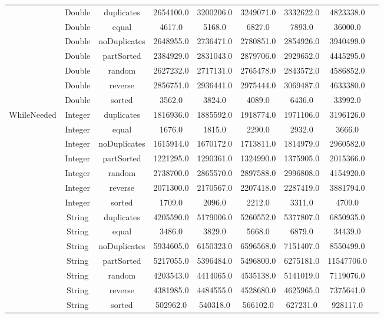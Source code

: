 \documentclass{article}
\begin{document}
\begin{table}[H]
\begin{tabular}{|c|c|c|c|c|c|c|c|c|}
        & Double & duplicates & 2654100.0 & 3200206.0 & 3249071.0 & 3332622.0 & 4823338.0 \\
        & Double & equal & 4617.0 & 5168.0 & 6827.0 & 7893.0 & 36000.0 \\
        & Double & noDuplicates & 2648955.0 & 2736471.0 & 2780851.0 & 2854926.0 & 3940499.0 \\
        & Double & partSorted & 2384929.0 & 2831043.0 & 2879706.0 & 2929652.0 & 4445295.0 \\
        & Double & random & 2627232.0 & 2717131.0 & 2765478.0 & 2843572.0 & 4586852.0 \\
        & Double & reverse & 2856751.0 & 2936441.0 & 2975444.0 & 3069487.0 & 4633380.0 \\
        & Double & sorted & 3562.0 & 3824.0 & 4089.0 & 6436.0 & 33992.0 \\
        WhileNeeded
        & Integer & duplicates & 1816936.0 & 1885592.0 & 1918774.0 & 1971106.0 & 3196126.0 \\
        & Integer & equal & 1676.0 & 1815.0 & 2290.0 & 2932.0 & 3666.0 \\
        & Integer & noDuplicates & 1615914.0 & 1670172.0 & 1713811.0 & 1814979.0 & 2960582.0 \\
        & Integer & partSorted & 1221295.0 & 1290361.0 & 1324990.0 & 1375905.0 & 2015366.0 \\
        & Integer & random & 2738700.0 & 2865570.0 & 2897588.0 & 2996808.0 & 4154920.0 \\
        & Integer & reverse & 2071300.0 & 2170567.0 & 2207418.0 & 2287419.0 & 3881794.0 \\
        & Integer & sorted & 1709.0 & 2096.0 & 2212.0 & 3311.0 & 4709.0 \\
        
        & String & duplicates & 4205590.0 & 5179006.0 & 5260552.0 & 5377807.0 & 6850935.0 \\
        & String & equal & 3486.0 & 3829.0 & 5668.0 & 6879.0 & 34439.0 \\
        & String & noDuplicates & 5934605.0 & 6150323.0 & 6596568.0 & 7151407.0 & 8550499.0 \\
        & String & partSorted & 5217055.0 & 5396484.0 & 5496800.0 & 6275181.0 & 11547706.0 \\
        & String & random & 4203543.0 & 4414065.0 & 4535138.0 & 5141019.0 & 7119076.0 \\
        & String & reverse & 4381985.0 & 4484555.0 & 4528680.0 & 4625965.0 & 7375641.0 \\
        & String & sorted & 502962.0 & 540318.0 & 566102.0 & 627231.0 & 928117.0 \\
        

\end{tabular}
\end{table}
\end{document}
